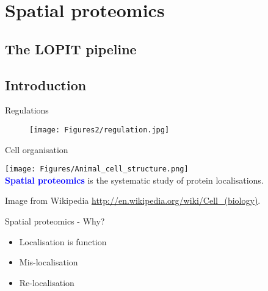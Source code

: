 \section{Spatial proteomics}

\subsection{The LOPIT pipeline}

\subsection*{Introduction}
\label{sec:spintro}

\begin{frame}{Regulations}
  \begin{figure}[h]
    \centering
    \texttt{[image: Figures2/regulation.jpg]}
  \end{figure}
\end{frame}

\label{sec:spspatprot}

\begin{frame}{Cell organisation}
  \begin{center}
    \texttt{[image: Figures/Animal\_cell\_structure.png]} \\
    \textbf{\textcolor{Blue}{Spatial proteomics}} is the systematic
    study of protein localisations.
  \end{center}

  \tiny Image from Wikipedia
  \url{http://en.wikipedia.org/wiki/Cell_(biology)}.
\end{frame}


\begin{frame}{Spatial proteomics - Why?}
  \begin{itemize}
  \item Localisation is function
  \item Mis-localisation \citep{Kau2004,Laurila2009}
  \item Re-localisation
  \end{itemize}
\end{frame}
 

